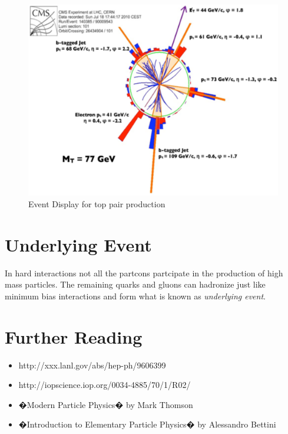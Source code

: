\begin{figure}[h]
\centering\includegraphics[scale=0.5]{./protonprotoncollisions/Pictures/fig13.pdf}
\caption{Event Display for top pair production}
\label{fig:topdisk}
\end{figure}

\section{ Underlying Event}

In hard interactions not all the partcons partcipate in the production of high mass particles.  The remaining quarks and gluons can hadronize just like  minimum bias interactions and form what is known as {\it underlying event}. 


\section{ Further Reading}

\begin{itemize}
\item http://xxx.lanl.gov/abs/hep-ph/9606399
\item http://iopscience.iop.org/0034-4885/70/1/R02/
\item �Modern Particle Physics� by Mark Thomson
\item �Introduction to Elementary Particle Physics� by Alessandro Bettini
\end{itemize}
